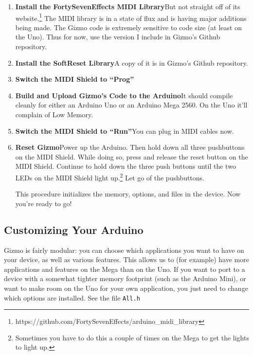 \documentclass{article}
\begin{document}
\begin{enumerate}
\item {\bf Install the FortySevenEffects MIDI Library}\quad But not straight off of its website.\footnote{https:/\!/github.com/FortySevenEffects/arduino\_midi\_library}  The MIDI library is in a state of flux and is having major additions being made.  The Gizmo code is extremely sensitive to code size (at least on the Uno).  Thus for now, use the version I include in Gizmo's Github repository.

\item {\bf Install the SoftReset Library}\quad A copy of it is in Gizmo's Github repository.

\item {\bf Switch the MIDI Shield to ``Prog''}

\item {\bf Build and Upload Gizmo's Code to the Arduino}\quad  It should compile cleanly for either an Arduino Uno or an Arduino Mega 2560.  On the Uno it'll complain of Low Memory.

\item {\bf Switch the MIDI Shield to ``Run''}\quad  You can plug in MIDI cables now.

\item {\bf Reset Gizmo}\quad Power up the Arduino.  Then hold down all three pushbuttons on the MIDI Shield.  While doing so, press and release the reset button on the MIDI Shield.  Continue to hold down the three push buttons until the two LEDs on the MIDI Shield light up.\footnote{Sometimes you have to do this a couple of times on the Mega to get the lights to light up.}  Let go of the pushbuttons.  

This procedure initializes the memory, options, and files in the device.  Now you're ready to go!

\end{enumerate}

\subsection{Customizing Your Arduino}

Gizmo is fairly modular: you can choose which applications you want to have on your device, as well as various features.  This allows us to (for example) have more applications and features on the Mega than on the Uno.  If you want to port to a device with a somewhat tighter memory footprint (such as the Arduino Mini), or want to make room on the Uno for your own application, you just need to change which options are installed.  See the file \texttt{All.h}
\end{document}
